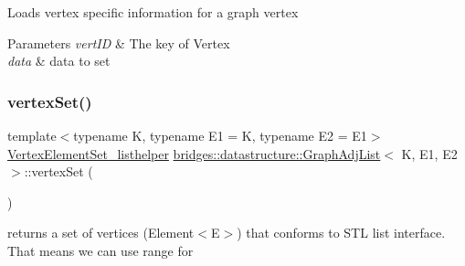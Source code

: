 Loads vertex specific information for a graph vertex


\begin{DoxyParams}{Parameters}
{\em vert\+ID} & The key of Vertex \\
\hline
{\em data} & data to set \\
\hline
\end{DoxyParams}
\mbox{\label{classbridges_1_1datastructure_1_1_graph_adj_list_a9dcf0bb4a68f3b02281c84e9bb69d6b3}} 
\subsubsection{\texorpdfstring{vertex\+Set()}{vertexSet()}\hspace{0.1cm}{\footnotesize\ttfamily [1/2]}}
{\footnotesize\ttfamily template$<$typename K, typename E1 = K, typename E2 = E1$>$ \\
\hyperlink{classbridges_1_1datastructure_1_1_graph_adj_list_1_1_vertex_element_set__listhelper}{Vertex\+Element\+Set\+\_\+listhelper} \hyperlink{classbridges_1_1datastructure_1_1_graph_adj_list}{bridges\+::datastructure\+::\+Graph\+Adj\+List}$<$ K, E1, E2 $>$\+::vertex\+Set (\begin{DoxyParamCaption}{ }\end{DoxyParamCaption})\hspace{0.3cm}{\ttfamily [inline]}}



returns a set of vertices (Element$<$\+E$>$) that conforms to S\+TL list interface. That means we can use range for 

\mbox{\label{classbridges_1_1datastructure_1_1_graph_adj_list_a5ef96f5df21b2f9743b7bb79c10cf090}} 
